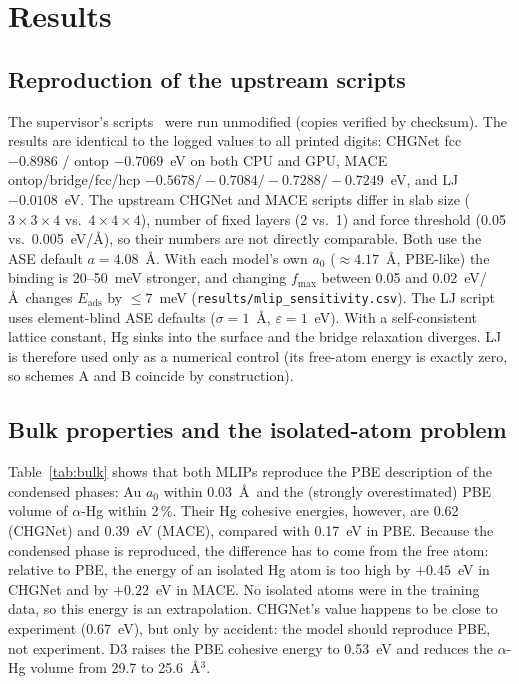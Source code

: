\documentclass[11pt,a4paper]{article}
\newcommand{\Eads}{E_\mathrm{ads}}
\begin{document}
\section{Results}
\subsection{Reproduction of the upstream scripts}\label{sec:upstream}
The supervisor's scripts~\cite{upstream} were run unmodified (copies verified by checksum). The results are identical to the logged values to all printed digits: CHGNet fcc $-0.8986$ / ontop $-0.7069$~eV on both CPU and GPU, MACE ontop/bridge/fcc/hcp $-0.5678/-0.7084/-0.7288/-0.7249$~eV, and LJ $-0.0108$~eV. The upstream CHGNet and MACE scripts differ in slab size ($3\times3\times4$ vs.\ $4\times4\times4$), number of fixed layers (2 vs.\ 1) and force threshold (0.05 vs.\ 0.005~eV/\AA), so their numbers are not directly comparable. Both use the ASE default $a=4.08$~\AA. With each model's own $a_0$ ($\approx4.17$~\AA, PBE-like) the binding is 20--50~meV stronger, and changing $f_\mathrm{max}$ between 0.05 and 0.02~eV/\AA\ changes $\Eads$ by $\le7$~meV (\texttt{results/mlip\_sensitivity.csv}). The LJ script uses element-blind ASE defaults ($\sigma=1$~\AA, $\varepsilon=1$~eV). With a self-consistent lattice constant, Hg sinks into the surface and the bridge relaxation diverges. LJ is therefore used only as a numerical control (its free-atom energy is exactly zero, so schemes A and B coincide by construction).

\subsection{Bulk properties and the isolated-atom problem}
\begin{table}[h]
\centering
\caption{Bulk reference properties. $E_\mathrm{coh}(\mathrm{Hg}) = E(\text{Hg atom}) - E(\alpha\text{-Hg})$ per atom. Experimental Au lattice constant 4.078~\AA; Hg cohesive energy from Ref.~\cite{kittel}.}
\label{tab:bulk}

\end{table}

Table~\ref{tab:bulk} shows that both MLIPs reproduce the PBE description of the condensed phases: Au $a_0$ within 0.03~\AA\ and the (strongly overestimated) PBE volume of $\alpha$-Hg within 2\,\%. Their Hg cohesive energies, however, are 0.62 (CHGNet) and 0.39~eV (MACE), compared with 0.17~eV in PBE. Because the condensed phase is reproduced, the difference has to come from the free atom: relative to PBE, the energy of an isolated Hg atom is too high by $+0.45$~eV in CHGNet and by $+0.22$~eV in MACE. No isolated atoms were in the training data, so this energy is an extrapolation. CHGNet's value happens to be close to experiment (0.67~eV), but only by accident: the model should reproduce PBE, not experiment. D3 raises the PBE cohesive energy to 0.53~eV and reduces the $\alpha$-Hg volume from 29.7 to 25.6~\AA$^3$.
\end{document}
